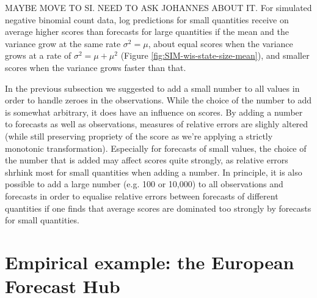 \documentclass{article}
\begin{document}
MAYBE MOVE TO SI. NEED TO ASK JOHANNES ABOUT IT. 
For simulated negative binomial count data, log predictions for small quantities receive on average higher scores than forecasts for large quantities if the mean and the variance grow at the same rate $\sigma^2 = \mu$, about equal scores when the variance grows at a rate of $\sigma^2 = \mu + \mu^2$ (Figure \ref{fig:SIM-wis-state-size-mean}), and smaller scores when the variance grows faster than that. 

In the previous subsection we suggested to add a small number to all values in order to handle zeroes in the observations. While the choice of the number to add is somewhat arbitrary, it does have an influence on scores. By adding a number to forecasts as well as observations, measures of relative errors are slighly altered (while still preserving propriety of the score as we're applying a strictly monotonic transformation). Especially for forecasts of small values, the choice of the number that is added may affect scores quite strongly, as relative errors shrhink most for small quantities when adding a number. In principle, it is also possible to add a large number (e.g. 100 or 10,000) to all observations and forecasts in order to equalise relative errors between forecasts of different quantities if one finds that average scores are dominated too strongly by forecasts for small quantities. 





\section{Empirical example: the European Forecast Hub}
\end{document}

